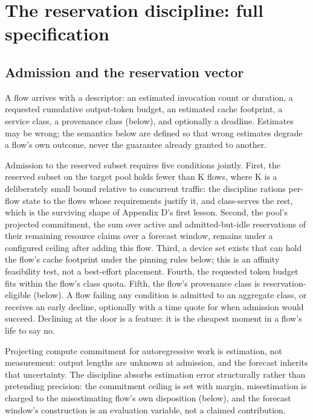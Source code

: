 \section{The reservation discipline: full specification}



\subsection{Admission and the reservation vector}

A flow arrives with a descriptor: an estimated invocation count or
duration, a requested cumulative output-token budget, an estimated cache
footprint, a service class, a provenance class (below), and optionally a deadline. Estimates may be wrong; the semantics below are
defined so that wrong estimates degrade a flow's own outcome, never the
guarantee already granted to another.

Admission to the reserved subset requires five conditions jointly. First,
the reserved subset on the target pool holds fewer than K flows, where K
is a deliberately small bound relative to concurrent traffic: the
discipline rations per-flow state to the flows whose requirements justify
it, and class-serves the rest, which is the surviving shape of Appendix D's first lesson. Second, the pool's projected commitment, the sum over
active and admitted-but-idle reservations of their remaining resource
claims over a forecast window, remains under a configured ceiling after
adding this flow. Third, a device set exists that can hold the flow's
cache footprint under the pinning rules below; this is an affinity
feasibility test, not a best-effort placement. Fourth, the requested
token budget fits within the flow's class quota. Fifth, the flow's provenance class is reservation-eligible (below). A flow failing
any condition is admitted to an aggregate class, or receives an early
decline, optionally with a time quote for when admission would succeed.
Declining at the door is a feature: it is the cheapest moment in a flow's
life to say no.

Projecting compute commitment for autoregressive work is estimation, not
measurement: output lengths are unknown at admission, and the forecast
inherits that uncertainty. The discipline absorbs estimation error
structurally rather than pretending precision: the commitment ceiling is
set with margin, misestimation is charged to the misestimating flow's
own disposition (below), and the forecast window's construction is an
evaluation variable, not a claimed contribution.

